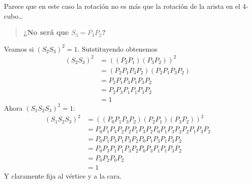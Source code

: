 \documentclass[spanish]{article}
\theoremstyle{definition}
\newtheorem*{obs}{Observación}
\begin{document}
Parece que en este caso la rotación no es más que la rotación de la arista en el 4-cubo…
\begin{quotation}
	\textbf{¿No será que $S_3=P_3P_2$?}
\end{quotation}
Veamos si $(S_2S_3)^2=1$. Sutstituyendo obtenemos
\begin{align*}
	(S_2S_3)^2&=((P_2P_1)(P_3P_2))^2\\
	&=(P_2P_1P_3P_2)(P_2P_1P_3P_2)\\
	&=P_2P_1P_3P_1P_3P_2\\
	&=P_2P_3P_1P_1P_3P_2\\
	&=1
\end{align*}
Ahora $(S_1S_2S_3)^2=1$:
\begin{align*}
	(S_1S_2S_3)^2&=((P_0P_1P_3P_2)(P_2P_1)(P_3P_2))^2\\
	&=P_0P_1P_3P_2P_2P_1P_3P_2P_0P_1P_3P_2P_2P_1P_3P_2\\
	&=P_0P_1P_3P_1P_3P_2P_0P_1P_3P_1P_3P_2\\
	&=P_0P_3P_1P_1P_3P_2P_0P_3P_1P_1P_3P_2\\
	&=P_0P_2P_0P_2\\
	&=1
\end{align*}
Y claramente fija al vértice y a la cara.
	\clearpage
\end{document}
